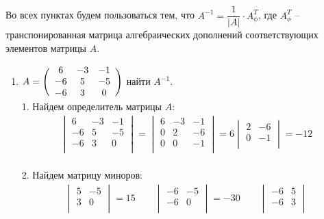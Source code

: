 		\subsection{}
		Во всех пунктах будем пользоваться тем, что $A^{-1} = \dfrac{1}{|A|} \cdot A_{\phi}^{T}$, где $A_{\phi}^{T}$ -- транспонированная матрица алгебраических дополнений соответствующих элементов матрицы $A$. 
		\begin{enumerate}
		\item
			$A = \Bigg(\begin{array}{c c c}
				6 & -3 & -1\\
				-6 & 5 & -5\\
				-6 & 3 & 0\\
			\end{array}\Bigg)$ найти $A^{-1}$. 
			\\
			1. Найдем определитель матрицы $A$:
			\begin{gather*}
				\begin{vmatrix}
					6 & -3 & -1\\
					-6 & 5 & -5\\
					-6 & 3 & 0\\
				\end{vmatrix}
				=
				\begin{vmatrix}
					6 & -3 & -1\\
					0 & 2 & -6\\
					0 & 0 & -1\\
				\end{vmatrix}
				= 6
				\begin{vmatrix}
					2 & -6\\
					0 & -1\\
				\end{vmatrix}
				= -12
			\end{gather*}
			\\
			2. Найдем матрицу миноров:
			\begin{gather*}
				\begin{vmatrix}
					5 & -5\\
					3 & 0\\
				\end{vmatrix}
				= 15\qquad 
				\begin{vmatrix}
					-6 & -5\\
					-6 & 0\\
				\end{vmatrix}
				= -30\qquad
				\begin{vmatrix}
					-6 & 5\\
					-6 & 3\\

\end{vmatrix}
\end{gather*}
\end{enumerate}
